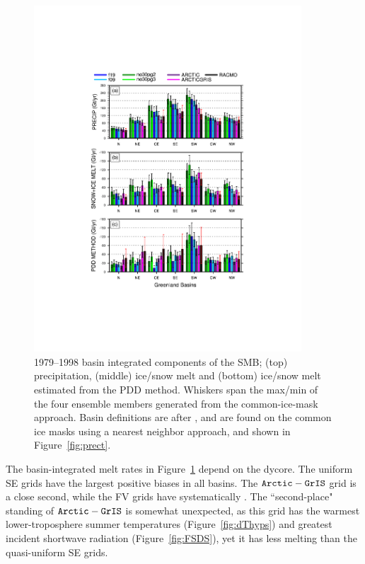 \documentclass[draft]{agujournal2019}
\begin{document}
\begin{figure}[t]
\begin{center}
         \includegraphics[width=100mm]{temp_tseries_BASIN.pdf}
\end{center}
\caption{1979--1998 basin integrated components of the SMB; (top) precipitation, (middle) ice/snow melt and (bottom) ice/snow melt estimated from the PDD method. Whiskers span the max/min of the four ensemble members generated from the common-ice-mask approach. Basin definitions are after , and are found on the common ice masks using a nearest neighbor approach, and shown in Figure~\ref{fig:prect}.}
\label{fig:basin}
\end{figure}

The basin-integrated melt rates in Figure~\ref{fig:basin} depend on the dycore. The {\color{blue}{quasi-}}uniform SE grids have the largest positive biases in all basins. The $\tt Arctic-GrIS$ grid is a close second, while the FV grids have systematically {\color{blue}{smaller melt-rates and melt-rate biases}}. The ``second-place" standing of $\tt Arctic-GrIS$ is somewhat unexpected, as this grid has the warmest lower-troposphere summer temperatures (Figure~\ref{fig:dThyps}) and greatest incident shortwave radiation (Figure~\ref{fig:FSDS}), yet it has less melting than the quasi-uniform SE grids.
\end{document}
